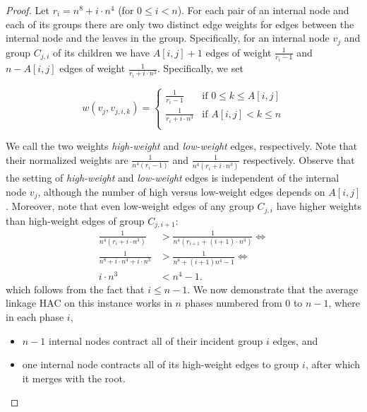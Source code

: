 \documentclass[11pt]{article}
\begin{document}
\begin{proof}
Let $r_i = n^8 + i \cdot n^4$ (for $0 \leq i < n$).
For each pair of an internal node and each of its groups there are only two distinct edge weights for edges between the internal node and the leaves in the group.
Specifically, for an internal node $v_j$ and group $C_{j,i}$ 
of its children we have $A[i, j]+1$ edges of weight $\frac{1}{r_i - 1}$ and $n - A[i, j]$ edges of weight $\frac{1}{r_i + i \cdot n^3}$. Specifically, we set

\[ w(v_j, v_{j,i,k}) =\begin{cases} \frac{1}{r_i - 1} & \text{if } 0 \leq k \leq A[i,j] \\
\frac{1}{r_i + i \cdot n^3} & \text{if }  A[i,j] < k \leq n \\
\end{cases}\]



We call the two weights \emph{high-weight} and \emph{low-weight} edges, respectively. 
Note that their normalized weights are $\frac{1}{n^4(r_i - 1)}$ and $\frac{1}{n^4(r_i + i\cdot n^3)}$ respectively. Observe that the setting of \emph{high-weight} and \emph{low-weight} edges is independent of the internal node $v_j$, although the number of high versus low-weight edges depends on $A[i,j]$.
Moreover, note that even low-weight edges of any group $C_{j,i}$ have higher weights than high-weight edges of group $C_{j,i+1}$:
\begin{align*}
\frac{1}{n^4(r_i + i\cdot n^3)} & > \frac{1}{n^4(r_{i+1} + (i+1)\cdot n^3)} \iff \\
\frac{1}{n^8 + i \cdot n^4 + i\cdot n^3} & > \frac{1}{n^8 + (i+1)n^4 -1} \iff \\
i \cdot n^3 & < n^4 - 1.
\end{align*}
which follows from the fact that $i \leq n-1$.
We now demonstrate that the average linkage HAC on this instance works in $n$ phases numbered from $0$ to $n-1$, where in each phase $i$,
\begin{itemize}
\item $n-1$ internal nodes contract all of their incident group $i$ edges, and
\item one internal node contracts all of its high-weight edges to group $i$, after which it merges with the root.
\end{itemize}


\end{proof}
\end{document}
